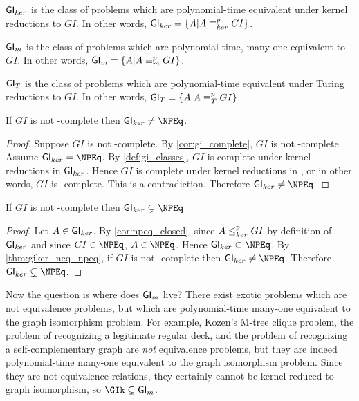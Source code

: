\begin{definition}\label{def:gi_classes}${\mathsf{GI}}_{ker}$ is the class of problems
  which are polynomial-time equivalent under kernel reductions to $GI$. In
  other words, ${\mathsf{GI}}_{ker}=\{A|A\equiv^{p}_{ker} GI\}$.

  ${\mathsf{GI}}_m$ is the class of problems which are polynomial-time, many-one
  equivalent to $GI$. In other words, ${\mathsf{GI}}_m=\{A|A\equiv^{p}_m GI\}$.

  ${\mathsf{GI}}_T$ is the class of problems which are polynomial-time equivalent under
  Turing reductions to $GI$. In other words, ${\mathsf{GI}}_T=\{A|A\equiv^{p}_T GI\}$.
\end{definition}

\begin{theorem}\label{thm:giker_neq_npeq}If $GI$ is not \NP-complete then
  $\GIker\neq\NPEq$.\end{theorem}
\begin{proof}
  Suppose $GI$ is not \NP-complete. By \autoref{cor:gi_complete}, $GI$ is not
  \NPEq-complete. Assume $\GIker=\NPEq$. By \autoref{def:gi_classes}, $GI$ is
  complete under kernel reductions in ${\mathsf{GI}}_{ker}$. Hence $GI$ is complete under
  kernel reductions in \NPEq, or in other words, $GI$ is \NPEq-complete. This
  is a contradiction. Therefore $\GIker\neq\NPEq$.
\end{proof}

\begin{theorem}If $GI$ is not \NP-complete then
  $\GIker\subsetneq\NPEq$\end{theorem}
\begin{proof}Let $A\in{\ensuremath{\mathsf{GI}}}_{ker}$. By \autoref{cor:npeq_closed}, since $A\leq^{p}_{ker}
  GI$ by definition of ${\mathsf{GI}}_{ker}$ and since $GI\in\NPEq$, $A\in\NPEq$. Hence
  $\GIker\subset\NPEq$. By \autoref{thm:giker_neq_npeq}, if $GI$ is not
  \NP-complete then $\GIker\neq\NPEq$. Therefore
  $\GIker\subsetneq\NPEq$.\end{proof}

Now the question is where does ${\mathsf{GI}}_m$ live? There exist exotic problems which
are not equivalence problems, but which are polynomial-time many-one equivalent
to the graph isomorphism problem. For example, Kozen's M-tree clique problem,
the problem of recognizing a legitimate regular deck, and the problem of
recognizing a self-complementary graph are \emph{not} equivalence problems, but
they are indeed polynomial-time many-one equivalent to the graph isomorphism
problem. Since they are not equivalence relations, they certainly cannot be
kernel reduced to graph isomorphism, so $\GIk\subsetneq\GIm$.

